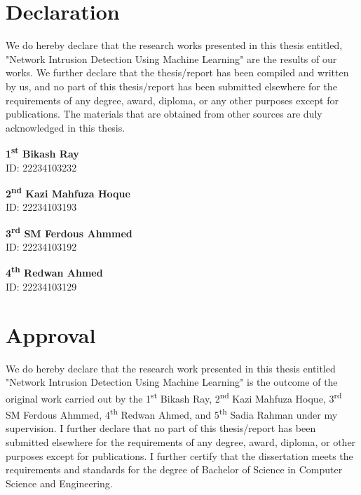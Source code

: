 \documentclass[12pt, a4paper]{report}
\begin{document}
\chapter*{Declaration}
{}
We do hereby declare that the research works presented in this thesis entitled, "Network Intrusion Detection Using Machine Learning" are the results of our works. We further declare that the thesis/report has been compiled and written by us, and no part of this thesis/report has been submitted elsewhere for the requirements of any degree, award, diploma, or any other purposes except for publications. The materials that are obtained from other sources are duly acknowledged in this thesis.

\vspace{2cm}
\noindent
\begin{minipage}[t]{0.45\textwidth}
\textbf{1\textsuperscript{st} Bikash Ray}\\
ID: 22234103232
\end{minipage}
\hfill
\begin{minipage}[t]{0.45\textwidth}
\textbf{2\textsuperscript{nd} Kazi Mahfuza Hoque}\\
ID: 22234103193
\end{minipage}

\vspace{1.5cm}
\noindent
\begin{minipage}[t]{0.45\textwidth}
\textbf{3\textsuperscript{rd} SM Ferdous Ahmmed}\\
ID: 22234103192
\end{minipage}
\hfill
\begin{minipage}[t]{0.45\textwidth}
\textbf{4\textsuperscript{th} Redwan Ahmed}\\
ID: 22234103129
\end{minipage}
\clearpage

\chapter*{Approval}
{}
We do hereby declare that the research work presented in this thesis entitled "Network Intrusion Detection Using Machine Learning" is the outcome of the original work carried out by the 1\textsuperscript{st} Bikash Ray, 2\textsuperscript{nd} Kazi Mahfuza Hoque, 3\textsuperscript{rd} SM Ferdous Ahmmed, 4\textsuperscript{th} Redwan Ahmed, and 5\textsuperscript{th} Sadia Rahman under my supervision. I further declare that no part of this thesis/report has been submitted elsewhere for the requirements of any degree, award, diploma, or other purposes except for publications. I further certify that the dissertation meets the requirements and standards for the degree of Bachelor of Science in Computer Science and Engineering.
\end{document}
